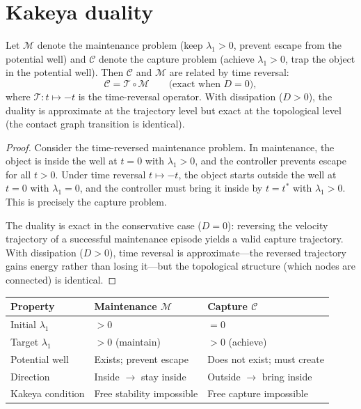 \section{Kakeya duality}
\label{sec:c-kakeya}

\begin{theorem}
\label{thm:c-kakeya}
Let $\mathcal{M}$ denote the maintenance problem (keep
$\lambda_1 > 0$, prevent escape from the potential well) and
$\mathcal{C}$ denote the capture problem (achieve $\lambda_1 > 0$,
trap the object in the potential well).  Then $\mathcal{C}$ and
$\mathcal{M}$ are related by time reversal:
\[
  \mathcal{C} = \mathcal{T} \circ \mathcal{M}
  \qquad \text{(exact when $D = 0$)},
\]
where $\mathcal{T}\colon t \mapsto -t$ is the time-reversal
operator.  With dissipation ($D > 0$), the duality is
approximate at the trajectory level but exact at the
topological level (the contact graph transition is identical).
\end{theorem}

\begin{proof}
Consider the time-reversed maintenance problem.  In maintenance,
the object is inside the well at $t = 0$ with $\lambda_1 > 0$,
and the controller prevents escape for all $t > 0$.  Under time
reversal $t \mapsto -t$, the object starts outside the well at
$t = 0$ with $\lambda_1 = 0$, and the controller must bring it
inside by $t = t^*$ with $\lambda_1 > 0$.  This is precisely the
capture problem.

The duality is exact in the conservative case ($D = 0$):
reversing the velocity trajectory of a successful maintenance
episode yields a valid capture trajectory.  With dissipation
($D > 0$), time reversal is approximate---the reversed trajectory
gains energy rather than losing it---but the topological structure
(which nodes are connected) is identical.
\end{proof}

\begin{center}
\begin{tabular}{@{}lll@{}}
\toprule
\textbf{Property} & \textbf{Maintenance $\mathcal{M}$}
  & \textbf{Capture $\mathcal{C}$} \\
\midrule
Initial $\lambda_1$ & $> 0$ & $= 0$ \\
Target $\lambda_1$ & $> 0$ (maintain) & $> 0$ (achieve) \\
Potential well & Exists; prevent escape
  & Does not exist; must create \\
Direction & Inside $\to$ stay inside
  & Outside $\to$ bring inside \\
Kakeya condition & Free stability impossible
  & Free capture impossible \\
\bottomrule
\end{tabular}
\end{center}

